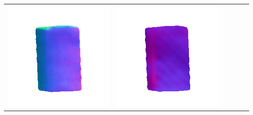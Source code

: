 \begin{center}
\begin{tabularx}{\linewidth}{@{}Y@{}Y@{}Y@{}Y@{}Y@{}Y@{}}
\includegraphics[width=\linewidth]{semisynthetic/20160617_18_marrnet_out.png} &
\includegraphics[width=\linewidth]{semisynthetic/20160617_18_ef_out.png} \\

\end{tabularx}
\end{center}
